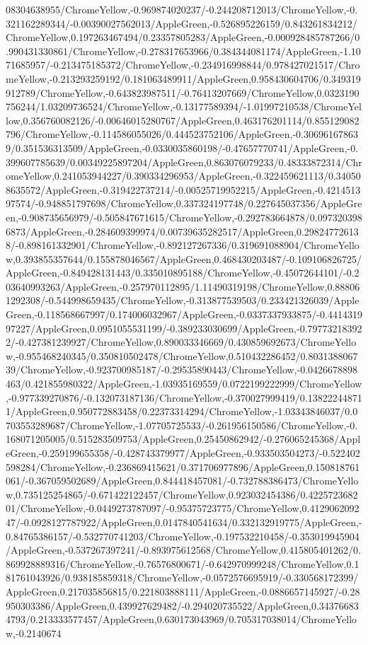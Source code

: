 {\begin{tikzternal}
08304638955/ChromeYellow,-0.969874020237/-0.244208712013/ChromeYellow,-0.321162289344/-0.00390027562013/AppleGreen,-0.526895226159/0.843261834212/ChromeYellow,0.197263467494/0.23357805283/AppleGreen,-0.000928485787266/0.990431330861/ChromeYellow,-0.278317653966/0.384344081174/AppleGreen,-1.1071685957/-0.213475185372/ChromeYellow,-0.234916998844/0.978427021517/ChromeYellow,-0.213293259192/0.181063489911/AppleGreen,0.958430604706/0.349319912789/ChromeYellow,-0.643823987511/-0.76413207669/ChromeYellow,0.0323190756244/1.03209736524/ChromeYellow,-0.13177589394/-1.01997210538/ChromeYellow,0.356760082126/-0.00646015280767/AppleGreen,0.463176201114/0.855129082796/ChromeYellow,-0.114586055026/0.444523752106/AppleGreen,-0.306961678639/0.351536313509/AppleGreen,-0.0330035860198/-0.47657770741/AppleGreen,-0.399607785639/0.00349225897204/AppleGreen,0.863076079233/0.48333872314/ChromeYellow,0.241053944227/0.390334296953/AppleGreen,-0.322459621113/0.340508635572/AppleGreen,-0.319422737214/-0.00525719952215/AppleGreen,-0.421451397574/-0.948851797698/ChromeYellow,0.337324197748/0.227645037356/AppleGreen,-0.908735656979/-0.505847671615/ChromeYellow,-0.292783664878/0.0973203986873/AppleGreen,-0.284609399974/0.00739635282517/AppleGreen,0.298247726138/-0.898161332901/ChromeYellow,-0.892127267336/0.319691088904/ChromeYellow,0.393855357644/0.155878046567/AppleGreen,0.468430203487/-0.109106826725/AppleGreen,-0.849428131443/0.335010895188/ChromeYellow,-0.45072644101/-0.203640993263/AppleGreen,-0.257970112895/1.11490319198/ChromeYellow,0.888061292308/-0.544998659435/ChromeYellow,-0.313877539503/0.233421326039/AppleGreen,-0.118568667997/0.174006032967/AppleGreen,-0.0337337933875/-0.441431997227/AppleGreen,0.0951055531199/-0.389233030699/AppleGreen,-0.797732183922/-0.427381239927/ChromeYellow,0.890033346669/0.430859692673/ChromeYellow,-0.955468240345/0.350810502478/ChromeYellow,0.510432286452/0.803138806739/ChromeYellow,-0.923700985187/-0.29535890443/ChromeYellow,-0.0426678898463/0.421855980322/AppleGreen,-1.03935169559/0.0722199222999/ChromeYellow,-0.977339270876/-0.132073187136/ChromeYellow,-0.370027999419/0.138222448711/AppleGreen,0.950772883458/0.22373314294/ChromeYellow,-1.03343846037/0.0703553289687/ChromeYellow,-1.07705725533/-0.261956150586/ChromeYellow,-0.168071205005/0.515283509753/AppleGreen,0.25450862942/-0.276065245368/AppleGreen,-0.259199655358/-0.428743379977/AppleGreen,-0.933503504273/-0.522402598284/ChromeYellow,-0.236869415621/0.371706977896/AppleGreen,0.150818761061/-0.367059502689/AppleGreen,0.844418457081/-0.732788386473/ChromeYellow,0.735125254865/-0.671422122457/ChromeYellow,0.923032454386/0.422572368201/ChromeYellow,-0.0449273787097/-0.95375723775/ChromeYellow,0.412906209247/-0.0928127787922/AppleGreen,0.0147840541634/0.332132919775/AppleGreen,-0.84765386157/-0.532770741203/ChromeYellow,-0.197532210458/-0.353019945904/AppleGreen,-0.537267397241/-0.893975612568/ChromeYellow,0.415805401262/0.869928889316/ChromeYellow,-0.76576800671/-0.642970999248/ChromeYellow,0.181761043926/0.938185859318/ChromeYellow,-0.0572576695919/-0.330568172399/AppleGreen,0.217035856815/0.221803888111/AppleGreen,-0.0886657145927/-0.28950303386/AppleGreen,0.439927629482/-0.294020735522/AppleGreen,0.343766834793/0.213333577457/AppleGreen,0.630173043969/0.705317038014/ChromeYellow,-0.2140674
\end{tikzternal}}
